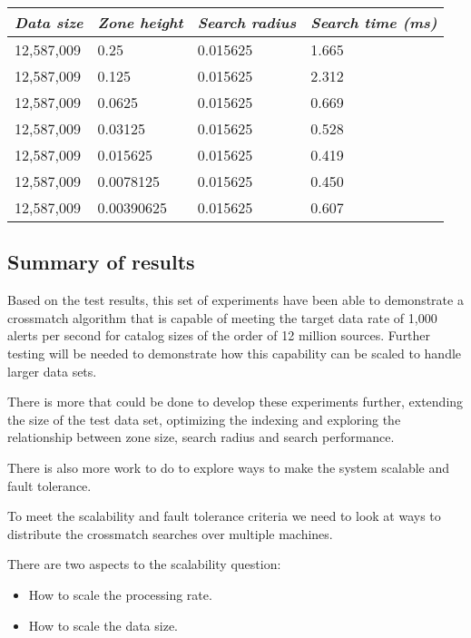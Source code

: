 \documentclass{article}
\newcommand{\crossmatch} {crossmatch\xspace}
\begin{document}
\begin{table}[h]
\centering
\begin{tabular}{|l|l|l|l|}
\hline
\textit{Data size} & \textit{Zone height} & \textit{Search radius} & \textit{Search time (ms)} \\ \hline
12,587,009 & 0.25       & 0.015625 & 1.665 \\ \hline
12,587,009 & 0.125      & 0.015625 & 2.312 \\ \hline
12,587,009 & 0.0625     & 0.015625 & 0.669 \\ \hline
12,587,009 & 0.03125    & 0.015625 & 0.528 \\ \hline
12,587,009 & 0.015625   & 0.015625 & 0.419 \\ \hline
12,587,009 & 0.0078125  & 0.015625 & 0.450 \\ \hline
12,587,009 & 0.00390625 & 0.015625 & 0.607 \\ \hline
\end{tabular}
\end{table}

\subsection{Summary of results}
\label{crossmatch-summary}

Based on the test results, this set of experiments have been able to demonstrate a \crossmatch algorithm that is capable of meeting the target data rate of 1,000 alerts per second for catalog sizes of the order of 12 million sources. Further testing will be needed to demonstrate how this capability can be scaled to handle larger data sets.

There is more  that could be done to develop these experiments further, extending the size of the test data set, optimizing the indexing and exploring the relationship between zone size, search radius and search performance.

There is also more work to do to explore ways to make the system scalable and fault tolerance.

To meet the scalability and fault tolerance criteria we need to look at ways to distribute the \crossmatch searches over multiple machines.

There are two aspects to the scalability question:
\begin{itemize}
    \item How to scale the processing rate.
    \item How to scale the data size.
\end{itemize}{}
\end{document}

